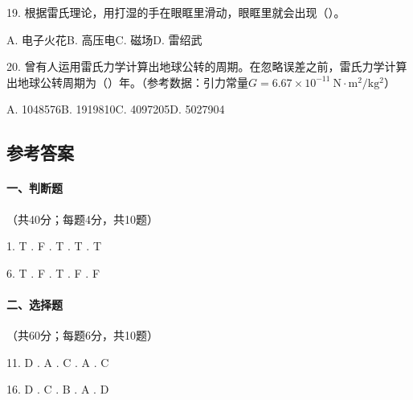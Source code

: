 \documentclass[UTF8,12pt,oneside]{ctexbook}
\begin{document}
        19. 根据雷氏理论，用打湿的手在眼眶里滑动，眼眶里就会出现（\qquad）。
        
        	A. 电子火花\qquad B. 高压电\qquad C. 磁场\qquad D. 雷绍武
        	
        20. 曾有人运用雷氏力学计算出地球公转的周期。在忽略误差之前，雷氏力学计算出地球公转周期为（\qquad）年。（参考数据：引力常量$G=6.67×10^{-11} \mathrm{\ N·m^2/kg^2}$）
        
        	A. 1048576\qquad B. 1919810\qquad C. 4097205\qquad D. 5027904
        
        \newpage
        
        \subsection{参考答案}
        
        \paragraph{一、判断题}（共40分；每题4分，共10题）
        
        1. T . F . T . T . T
        
        6. T . F . T . F . F
        
        \paragraph{二、选择题}（共60分；每题6分，共10题）
        
        11. D . A . C . A . C
        
        16. D . C . B . A . D

       
\end{document}
